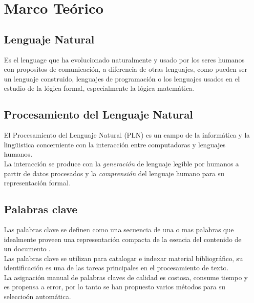 \chapter{Marco Te\'orico}
\section{Lenguaje Natural}
Es el lenguage que ha evolucionado naturalmente y usado por los seres humanos con
propositos de comunicaci\'on, a diferencia de otras lenguajes, como pueden ser un 
lenguaje construido, lenguajes de programaci\'on o los lenguajes usados en el estudio 
de la l\'ogica formal, especialmente la l\'ogica matem\'atica.  

\section{Procesamiento del Lenguaje Natural}
El Procesamiento del Lenguaje Natural (PLN) es un campo de la inform\'atica y la 
ling\"uistica concerniente con la interacci\'on entre computadoras y lenguajes
humanos. \\

La interacci\'on se produce con la \emph{generaci\'on} de lenguaje legible por humanos
a partir de datos procesados y la \emph{comprensi\'on} del lenguaje humano para su
representaci\'on formal.

\section{Palabras clave}
Las palabras clave se definen como una secuencia de una o mas palabras que idealmente
proveen una representaci\'on compacta de la esencia del contenido de un 
documento \cite{REC10}. \\

Las palabras clave se utilizan para catalogar e indexar material bibliogr\'afico,
su identificaci\'on es una de las tareas principales en el procesamiento de texto. \\

La asignaci\'on manual de palabras claves de calidad es costosa, consume tiempo y es
propensa a error, por lo tanto se han propuesto varios m\'etodos para su seleccio\'on
autom\'atica.

